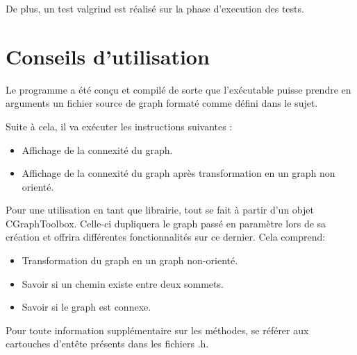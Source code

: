 		De plus, un test valgrind est réalisé sur la phase d'execution des tests.
			
	\chapter{Conseils d'utilisation}
	Le programme a été conçu et compilé de sorte que l'exécutable puisse prendre en arguments un fichier source de graph formaté comme défini dans le sujet.
	
	Suite à cela, il va exécuter les instructions suivantes :
	\begin{itemize}
		\item Affichage de la connexité du graph.
		\item Affichage de la connexité du graph après transformation en un graph non orienté. \\
	\end{itemize}
	Pour une utilisation en tant que librairie, tout se fait à partir d'un objet CGraphToolbox. Celle-ci dupliquera le graph passé en paramètre lors de sa création et offrira différentes fonctionnalités sur ce dernier. Cela comprend:
	\begin{itemize}
		\item Transformation du graph en un graph non-orienté.
		\item Savoir si un chemin existe entre deux sommets.
		\item Savoir si le graph est connexe.\\
	\end{itemize}
	
	Pour toute information supplémentaire sur les méthodes, se référer aux cartouches d'entête présents dans les fichiers .h.

